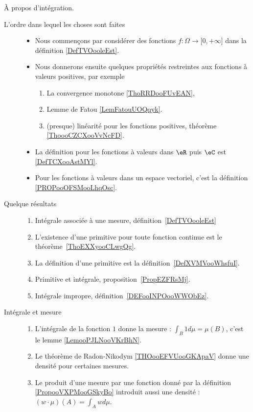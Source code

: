      \label{THEMEooHINHooJaSYQW}

À propos d'intégration.
\begin{description}

\item[L'ordre dans lequel les choses sont faites]
\begin{itemize}
    \item 
        Nous commençons par considérer des fonctions \( f\colon \Omega\to \mathopen[ 0 , +\infty \mathclose]\) dans la définition \ref{DefTVOooleEst}.
    \item
        Nous donnerons ensuite quelques propriétés restreintes aux fonctions à valeurs positives, par exemple
        \begin{enumerate}
            \item
                La convergence monotone \ref{ThoRRDooFUvEAN},
            \item
                Lemme de Fatou \ref{LemFatouUOQqyk}.
            \item 
                (presque) linéarité pour les fonctions positives, théorème \ref{ThoooCZCXooVvNcFD}.
        \end{enumerate}
        \item
            La définition pour les fonctions à valeurs dans \( \eR\) puis \( \eC\) est \ref{DefTCXooAstMYl}.
        \item
            Pour les fonctions à valeurs dans un espace vectoriel, c'est la définition \ref{PROPooOFSMooLhqOsc}.
\end{itemize}
    \item[Quelque résultats] 
\begin{enumerate}
    \item
        Intégrale associée à une mesure, définition~\ref{DefTVOooleEst}
\item
    L'existence d'une primitive pour toute fonction continue est le théorème~\ref{ThoEXXyooCLwgQg}.
\item
    La définition d'une primitive est la définition~\ref{DefXVMVooWhsfuI}.
\item
    Primitive et intégrale, proposition~\ref{PropEZFRsMj}.
\item
    Intégrale impropre, définition~\ref{DEFooINPOooWWObEz}.
\end{enumerate}
\item[Intégrale et mesure]
    \begin{enumerate}
        \item
            L'intégrale de la fonction \( 1\) donne la mesure : \( \int_B1d\mu=\mu(B)\), c'est le lemme \ref{LemooPJLNooVKrBhN}.
        \item
            Le théorème de Radon-Nikodym \ref{THOooEFVUooGKApaV} donne une densité pour certaines mesures.
        \item
            Le produit d'une mesure par une fonction donné par la définition \ref{PropooVXPMooGSkyBo} introduit aussi une densité : \( (w\cdot \mu)(A)=\int_Awd\mu\).
    \end{enumerate}


\end{description}
